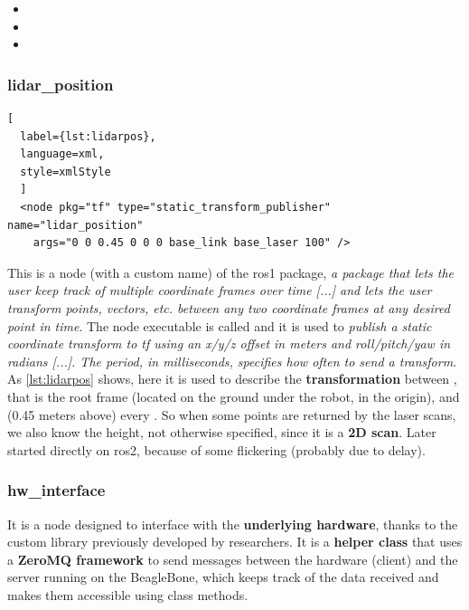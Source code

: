 \begin{itemize}
    \item {}
    \item {}
    \item {}
\end{itemize}

\subsubsection{lidar\_position}

\begin{lstlisting}[
  label={lst:lidarpos},
  language=xml,
  style=xmlStyle
  ]
  <node pkg="tf" type="static_transform_publisher" name="lidar_position"
    args="0 0 0.45 0 0 0 base_link base_laser 100" />
\end{lstlisting}

This is a node (with a custom name) of the \acrshort{ros}1  package, \textit{a package that lets the user keep track of multiple coordinate frames over time [...] and lets the user transform points, vectors, etc. between any two coordinate frames at any desired point in time}\cite{tf}. The node executable is called  and it is used to \textit{publish a static coordinate transform to tf using an x/y/z offset in meters and roll/pitch/yaw in radians [...]. The period, in milliseconds, specifies how often to send a transform}\cite{tf}. 
As \autoref{lst:lidarpos} shows, here it is used to describe the \textbf{transformation} between , that is the root frame (located on the ground under the robot, in the origin), and  (0.45 meters above) every . So when some points are returned by the laser scans, we also know the height, not otherwise specified, since it is a \textbf{2D scan}. Later started directly on \acrshort{ros}2, because of some flickering (probably due to  delay).

\subsubsection{hw\_interface}

It is a node designed to interface with the \textbf{underlying hardware}, thanks to the custom  library previously developed by researchers. It is a \textbf{helper class} that uses a \textbf{ZeroMQ framework} to send messages between the hardware (client) and the server running on the BeagleBone, which keeps track of the data received and makes them accessible using class methods.

